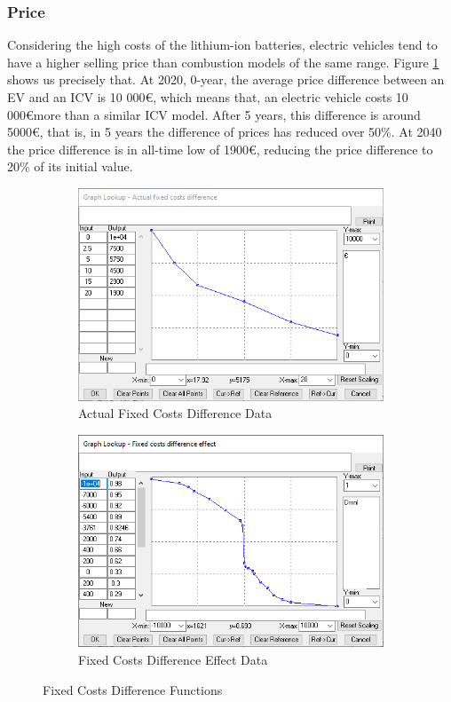 \subsubsection{Price}
Considering the high costs of the lithium-ion batteries, electric vehicles tend to have a higher selling price than combustion models of the same range. Figure \ref{fig:fixed-costs} shows us precisely that. At 2020, 0-year, the average price difference between an EV and an ICV is 10 000\euro, which means that, an electric vehicle costs 10 000\euro \space more than a similar ICV model. After 5 years, this difference is around 5000\euro, that is, in 5 years the difference of prices has reduced over 50\%. At 2040 the price difference is in all-time low of 1900\euro, reducing the price difference to 20\% of its initial value.

\begin{figure}[htbp]
\centering
\begin{subfigure}{0.5\textwidth}
  \centering
  \includegraphics[width=0.98\linewidth]{img/fixed-costs-difference.png}
  \caption{Actual Fixed Costs Difference Data}
  \label{fig:fixed-costs}
\end{subfigure}%
\begin{subfigure}{0.5\textwidth}
  \centering
  \includegraphics[width=0.98\linewidth]{img/fixed-costs-difference-effect.png}
  \caption{Fixed Costs Difference Effect Data}
  \label{fig:fixed-costs-effect}
\end{subfigure}
\caption{Fixed Costs Difference Functions}
\label{fig:fixed-costs-funcs}
\end{figure}

